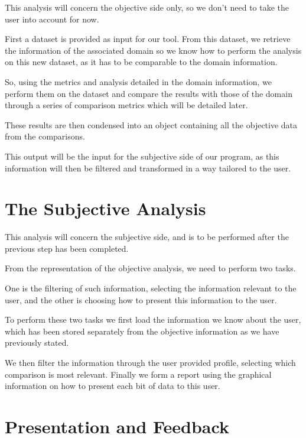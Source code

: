 This analysis will concern the objective side only, so we don't need to take the user into account for now.

First a dataset is provided as input for our tool. From this dataset, we retrieve the information of the associated domain so we know how to perform the analysis on this new dataset, as it has to be comparable to the domain information.

So, using the metrics and analysis detailed in the domain information, we perform them on the dataset and compare the results with those of the domain through a series of comparison metrics which will be detailed later.

These results are then condensed into an object containing all the objective data from the comparisons.

This output will be the input for the subjective side of our program, as this information will then be filtered and transformed in a way tailored to the user.

\section{The Subjective Analysis}
\label{cap2:sec:subjective}

This analysis will concern the subjective side, and is to be performed after the previous step has been completed.

From the representation of the objective analysis, we need to perform two tasks.

One is the filtering of such information, selecting the information relevant to the user, and the other is choosing how to present this information to the user.

To perform these two tasks we first load the information we know about the user, which has been stored separately from the objective information as we have previously stated.

We then filter the information through the user provided profile, selecting which comparison is most relevant. Finally we form a report using the graphical information on how to present each bit of data to this user.

\section{Presentation and Feedback}
\label{cap2:sec:feedback}

